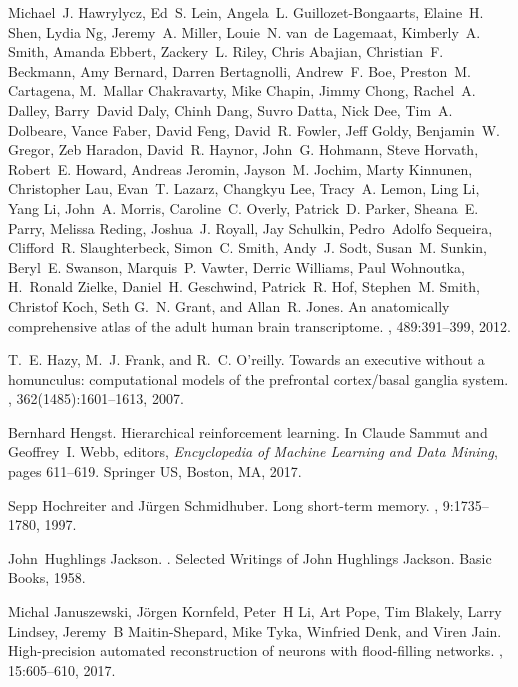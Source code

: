 \documentclass[letterpaper,11pt]{article}
\begin{document}
\begin{thebibliography}{100}
Michael~J. Hawrylycz, Ed~S. Lein, Angela~L. Guillozet-Bongaarts, Elaine~H.
  Shen, Lydia Ng, Jeremy~A. Miller, Louie~N. van~de Lagemaat, Kimberly~A.
  Smith, Amanda Ebbert, Zackery~L. Riley, Chris Abajian, Christian~F. Beckmann,
  Amy Bernard, Darren Bertagnolli, Andrew~F. Boe, Preston~M. Cartagena,
  M.~Mallar Chakravarty, Mike Chapin, Jimmy Chong, Rachel~A. Dalley,
  Barry~David Daly, Chinh Dang, Suvro Datta, Nick Dee, Tim~A. Dolbeare, Vance
  Faber, David Feng, David~R. Fowler, Jeff Goldy, Benjamin~W. Gregor, Zeb
  Haradon, David~R. Haynor, John~G. Hohmann, Steve Horvath, Robert~E. Howard,
  Andreas Jeromin, Jayson~M. Jochim, Marty Kinnunen, Christopher Lau, Evan~T.
  Lazarz, Changkyu Lee, Tracy~A. Lemon, Ling Li, Yang Li, John~A. Morris,
  Caroline~C. Overly, Patrick~D. Parker, Sheana~E. Parry, Melissa Reding,
  Joshua~J. Royall, Jay Schulkin, Pedro~Adolfo Sequeira, Clifford~R.
  Slaughterbeck, Simon~C. Smith, Andy~J. Sodt, Susan~M. Sunkin, Beryl~E.
  Swanson, Marquis~P. Vawter, Derric Williams, Paul Wohnoutka, H.~Ronald
  Zielke, Daniel~H. Geschwind, Patrick~R. Hof, Stephen~M. Smith, Christof Koch,
  Seth G.~N. Grant, and Allan~R. Jones.
\newblock An anatomically comprehensive atlas of the adult human brain
  transcriptome.
, 489:391--399, 2012.

T.~E. Hazy, M.~J. Frank, and R.~C. O'reilly.
\newblock Towards an executive without a homunculus: computational models of
  the prefrontal cortex/basal ganglia system.
, 362(1485):1601--1613, 2007.

Bernhard Hengst.
\newblock Hierarchical reinforcement learning.
\newblock In Claude Sammut and Geoffrey~I. Webb, editors, {\em Encyclopedia of
  Machine Learning and Data Mining}, pages 611--619. Springer US, Boston, MA,
  2017.

Sepp Hochreiter and J\"{u}rgen Schmidhuber.
\newblock Long short-term memory.
, 9:1735--1780, 1997.

John~Hughlings Jackson.
.
\newblock Selected Writings of John Hughlings Jackson. Basic Books, 1958.

Michal Januszewski, J\"{o}rgen Kornfeld, Peter~H Li, Art Pope, Tim Blakely,
  Larry Lindsey, Jeremy~B Maitin-Shepard, Mike Tyka, Winfried Denk, and Viren
  Jain.
\newblock High-precision automated reconstruction of neurons with flood-filling
  networks.
, 15:605--610, 2017.


\end{thebibliography}
\end{document}
